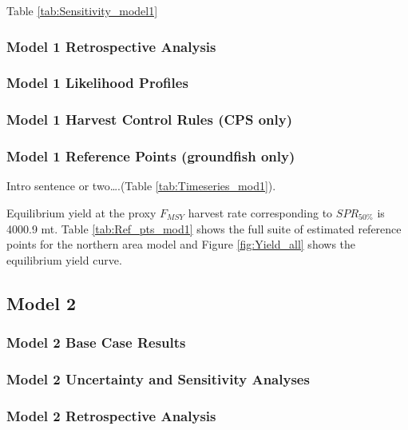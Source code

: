 \documentclass[12pt,]{article}
\begin{document}
Table \ref{tab:Sensitivity_model1}

\subsubsection{Model 1 Retrospective
Analysis}\label{model-1-retrospective-analysis}

\subsubsection{Model 1 Likelihood
Profiles}\label{model-1-likelihood-profiles}

\subsubsection{Model 1 Harvest Control Rules (CPS
only)}\label{model-1-harvest-control-rules-cps-only}

\subsubsection{Model 1 Reference Points (groundfish
only)}\label{model-1-reference-points-groundfish-only}

Intro sentence or two\ldots{}.(Table \ref{tab:Timeseries_mod1}).

Equilibrium yield at the proxy \(F_{MSY}\) harvest rate corresponding to
\(SPR_{50\%}\) is 4000.9 mt. Table \ref{tab:Ref_pts_mod1} shows the full
suite of estimated reference points for the northern area model and
Figure \ref{fig:Yield_all} shows the equilibrium yield curve.

\subsection{Model 2}\label{model-2}

\subsubsection{Model 2 Base Case
Results}\label{model-2-base-case-results}

\subsubsection{Model 2 Uncertainty and Sensitivity
Analyses}\label{model-2-uncertainty-and-sensitivity-analyses}

\subsubsection{Model 2 Retrospective
Analysis}\label{model-2-retrospective-analysis}
\end{document}
